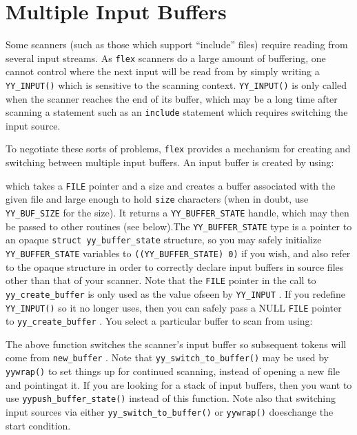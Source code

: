 \documentclass[openany,oneside]{book}
\begin{document}
\chapter{Multiple Input Buffers}


Some scanners (such as those which support “include” files) require
reading from several input streams.  As \verb`flex` scanners do a large
amount of buffering, one cannot control where the next input will be
read from by simply writing a \verb`YY_INPUT()` which is sensitive to
the scanning context. \verb`YY_INPUT()` is only called when the scanner
reaches the end of its buffer, which may be a long time after scanning a
statement such as an \verb`include` statement which requires switching
the input source.

To negotiate these sorts of problems, \verb`flex` provides a mechanism
for creating and switching between multiple input buffers.  An input
buffer is created by using:



which takes a \verb`FILE` pointer and a size and creates a buffer
associated with the given file and large enough to hold \verb`size` characters (when in doubt, use \verb`YY_BUF_SIZE` for the size).  It
returns a \verb`YY_BUFFER_STATE` handle, which may then be passed to
other routines (see below).The \verb`YY_BUFFER_STATE` type is a
pointer to an opaque \verb`struct yy_buffer_state` structure, so you may
safely initialize \verb`YY_BUFFER_STATE` variables to \verb`((YY_BUFFER_STATE) 0)` if you wish, and also refer to the opaque structure in order to
correctly declare input buffers in source files other than that of your
scanner.  Note that the \verb`FILE` pointer in the call to \verb`yy_create_buffer` is only used as the value ofseen by \verb`YY_INPUT` .  If you redefine \verb`YY_INPUT()` so it no longer uses, then you can safely pass a NULL \verb`FILE` pointer to \verb`yy_create_buffer` .  You select a particular buffer to scan from
using:

The above function switches the scanner's input buffer so subsequent tokens
will come from \verb`new_buffer` .  Note that \verb`yy_switch_to_buffer()` may
be used by \verb`yywrap()` to set things up for continued scanning, instead of
opening a new file and pointingat it. If you are looking for a
stack of input buffers, then you want to use \verb`yypush_buffer_state()` instead of this function. Note also that switching input sources via either \verb`yy_switch_to_buffer()` or \verb`yywrap()` doeschange the
start condition.
\end{document}

